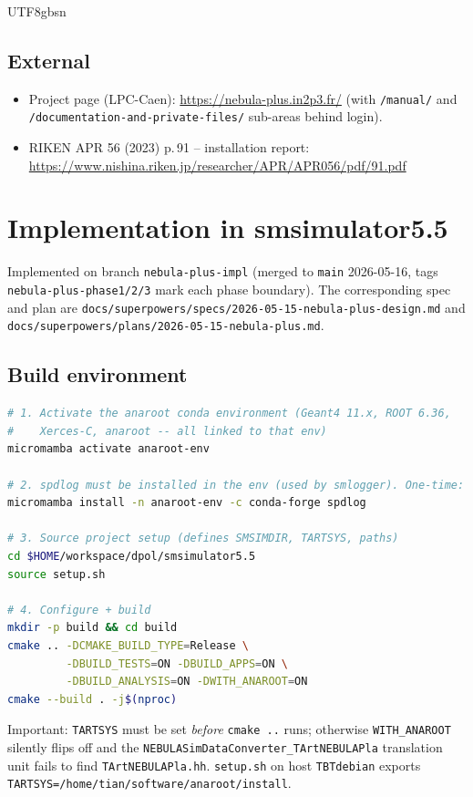 \documentclass[11pt,a4paper]{article}
\begin{document}
\begin{CJK}{UTF8}{gbsn}
\subsection{External}

\begin{itemize}
  \item Project page (LPC-Caen):
    \url{https://nebula-plus.in2p3.fr/}
    (with \texttt{/manual/} and \texttt{/documentation-and-private-files/}
    sub-areas behind login).
  \item RIKEN APR 56 (2023) p.\,91 -- installation report:
    \url{https://www.nishina.riken.jp/researcher/APR/APR056/pdf/91.pdf}
\end{itemize}

\section{Implementation in smsimulator5.5}
\label{sec:impl}

Implemented on branch \texttt{nebula-plus-impl} (merged to \texttt{main}
2026-05-16, tags \texttt{nebula-plus-phase1/2/3} mark each phase boundary).
The corresponding spec and plan are
\texttt{docs/superpowers/specs/2026-05-15-nebula-plus-design.md}
and
\texttt{docs/superpowers/plans/2026-05-15-nebula-plus.md}.

\subsection{Build environment}

\begin{lstlisting}[language=bash]
# 1. Activate the anaroot conda environment (Geant4 11.x, ROOT 6.36,
#    Xerces-C, anaroot -- all linked to that env)
micromamba activate anaroot-env

# 2. spdlog must be installed in the env (used by smlogger). One-time:
micromamba install -n anaroot-env -c conda-forge spdlog

# 3. Source project setup (defines SMSIMDIR, TARTSYS, paths)
cd $HOME/workspace/dpol/smsimulator5.5
source setup.sh

# 4. Configure + build
mkdir -p build && cd build
cmake .. -DCMAKE_BUILD_TYPE=Release \
         -DBUILD_TESTS=ON -DBUILD_APPS=ON \
         -DBUILD_ANALYSIS=ON -DWITH_ANAROOT=ON
cmake --build . -j$(nproc)
\end{lstlisting}

Important: \texttt{TARTSYS} must be set \emph{before} \texttt{cmake ..} runs;
otherwise \texttt{WITH\_ANAROOT} silently flips off and the
\texttt{NEBULASimDataConverter\_TArtNEBULAPla} translation unit fails to find
\texttt{TArtNEBULAPla.hh}. \texttt{setup.sh} on host \texttt{TBTdebian} exports
\texttt{TARTSYS=/home/tian/software/anaroot/install}.


\end{CJK}
\end{document}
